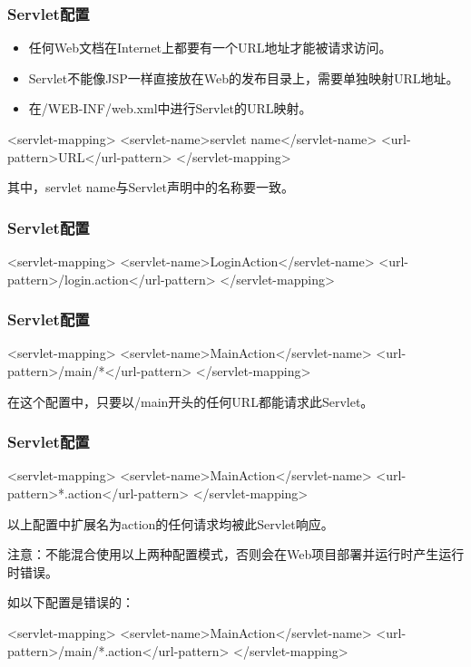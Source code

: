 \begin{frame}[fragile] %
\frametitle{Servlet配置}
\begin{itemize}
\item 任何Web文档在Internet上都要有一个URL地址才能被请求访问。
\item Servlet不能像JSP一样直接放在Web的发布目录上，需要单独映射URL地址。
\item 在{\Red /WEB-INF/web.xml}中进行Servlet的URL映射。
\end{itemize}


\begin{xmlCode}
<servlet-mapping>
  <servlet-name>servlet name</servlet-name>
  <url-pattern>URL</url-pattern>
</servlet-mapping>
\end{xmlCode}
{\kai 其中，servlet name与Servlet声明中的名称要一致。}
\end{frame}

\begin{frame}[fragile] %
\frametitle{Servlet配置}

\begin{xmlCode}
<servlet-mapping>
  <servlet-name>LoginAction</servlet-name>
  <url-pattern>/login.action</url-pattern>
</servlet-mapping>
\end{xmlCode}
\end{frame}

\begin{frame}[fragile] %
\frametitle{Servlet配置}

\begin{xmlCode}
<servlet-mapping>
  <servlet-name>MainAction</servlet-name>
  <url-pattern>/main/*</url-pattern>
</servlet-mapping>
\end{xmlCode}

在这个配置中，只要以/main开头的任何URL都能请求此Servlet。
\end{frame}

\begin{frame}[fragile] %
\frametitle{Servlet配置}

\begin{xmlCode}
<servlet-mapping>
  <servlet-name>MainAction</servlet-name>
  <url-pattern>*.action</url-pattern>
</servlet-mapping>
\end{xmlCode}

以上配置中扩展名为action的任何请求均被此Servlet响应。

{\Red\kai 注意：不能混合使用以上两种配置模式，否则会在Web项目部署并运行时产生运行时错误。}

如以下配置是错误的：

\begin{xmlCode}
<servlet-mapping>
  <servlet-name>MainAction</servlet-name>
  <url-pattern>/main/*.action</url-pattern>
</servlet-mapping>
\end{xmlCode}
\end{frame}

